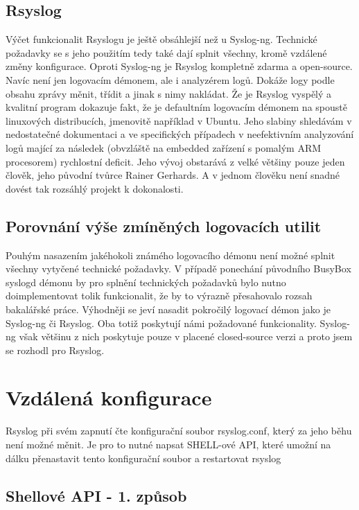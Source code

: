 \documentclass[thesis=B,czech]{FITthesis}[2012/06/26]
\begin{document}
\subsection*{Rsyslog}
Výčet funkcionalit Rsyslogu je ještě obsáhlejší než u Syslog-ng. Technické požadavky se s jeho použitím tedy také dají splnit všechny, kromě vzdálené změny konfigurace. Oproti Syslog-ng je Rsyslog kompletně zdarma a open-source. Navíc není jen logovacím démonem, ale i analyzérem logů. Dokáže logy podle obsahu zprávy měnit, třídit a jinak s nimy nakládat.
Že je Rsyslog vyspělý a kvalitní program dokazuje fakt, že je defaultním logovacím démonem na spoustě linuxových distribucích, jmenovitě například v Ubuntu.
Jeho slabiny shledávám v nedostatečné dokumentaci a ve specifických případech v neefektivním analyzování logů mající za následek (obvzláště na embedded zařízení s pomalým ARM procesorem) rychlostní deficit. Jeho vývoj obstarává z velké většiny pouze jeden člověk, jeho původní tvůrce Rainer Gerhards. A v jednom člověku není snadné dovést tak rozsáhlý projekt k dokonalosti.

\subsection*{Porovnání výše zmíněných logovacích utilit}
Pouhým nasazením jakéhokoli známého logovacího démonu není možné splnit všechny vytyčené technické požadavky. V případě ponechání původního BusyBox syslogd démonu by pro splnění technických požadavků bylo nutno doimplementovat tolik funkcionalit, že by to výrazně přesahovalo rozsah bakalářské práce.
Výhodněji se jeví nasadit pokročilý logovací démon jako je Syslog-ng či Rsyslog. Oba totiž poskytují námi požadované funkcionality. Syslog-ng však většinu z nich poskytuje pouze v placené closed-source verzi a proto jsem se rozhodl pro Rsyslog.

\section{Vzdálená konfigurace}
Rsyslog při svém zapnutí čte konfigurační soubor rsyslog.conf, který za jeho běhu není možné měnit. Je pro to nutné napsat SHELL-ové API, které umožní na dálku přenastavit tento konfigurační soubor a restartovat rsyslog

\subsection*{Shellové API - 1. způsob}
\end{document}
